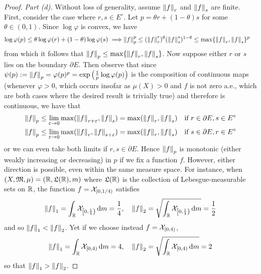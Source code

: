\begin{proof}
    \emph{Part (d).} Without loss of generality, assume \(\norm{f}_r\) and \(\norm{f}_s\) are finite. First, consider the case where \(r, s \in E^\circ\). Let \(p = \theta r + (1 - \theta) s\) for some \(\theta \in (0, 1)\). Since \(\log\varphi\) is convex, we have 
    \begin{align*}
        \log\varphi(p) \leq \theta \log\varphi(r) + (1 - \theta) \log\varphi(s) 
        \implies & \norm{f}_p^p \leq (\norm{f}_r^r)^\theta (\norm{f}_s^s)^{1 - \theta} 
        \leq \max\{\norm{f}_r, \norm{f}_s\}^p 
    \end{align*}
    from which it follows that \(\norm{f}_p \leq \max\{ \norm{f}_r, \norm{f}_s \}\). Now suppose either \(r\) or \(s\) lies on the boundary \(\partial E\). Then observe that since \(\psi(p) := \norm{f}_p = \varphi(p)^p = \exp \left( \frac{1}{p} \log \varphi(p) \right)\) is the composition of continuous maps (whenever \(\varphi > 0\), which occurs insofar as \(\mu(X) > 0\) and \(f\) is not zero a.e., which are both cases where the desired result is trivially true) and therefore is continuous, we have that
    \begin{align*}
        & \norm{f}_p \leq \lim_{\varepsilon \to 0} \max( \norm{f}_{r + \varepsilon}, \norm{f}_s ) = \max( \norm{f}_r, \norm{f}_s) 
        \quad \text{if } r \in \partial E, s \in E^\circ \\
        & \norm{f}_p \leq \lim_{\varepsilon \to 0} \max( \norm{f}_r, \norm{f}_{s + \varepsilon} ) = \max( \norm{f}_r, \norm{f}_s) 
        \quad \text{if } s \in \partial E, r \in E^\circ
    \end{align*}
    or we can even take both limits if \(r, s \in \partial E\). Hence \(\norm{f}_p\) is monotonic (either weakly increasing or decreasing) in \(p\) if we fix a function \(f\). However, either direction is possible, even within the same measure space. For instance, when \((X, \mathfrak{M}, \mu) = (\mathbb{R}, \mathfrak{L}(\mathbb{R}), m)\) where \(\mathfrak{L}(\mathbb{R})\) is the collection of Lebesgue-measurable sets on \(\mathbb{R}\), the function \(f=\mathcal{X}_{[0, 1/4)}\) satisfies
    \[
        \norm{f}_1 = \int_\mathbb{R} \mathcal{X}_{\left[0, \frac{1}{4}\right)} \, \mathrm{d}m = \frac{1}{4},
        \quad 
        \norm{f}_2 = \sqrt{\int_\mathbb{R} \mathcal{X}_{\left[0, \frac{1}{4}\right)} \, \mathrm{d}m} = \frac{1}{2}
    \]
    and so \(\norm{f}_1 < \norm{f}_2\). Yet if we choose instead \(f = \mathcal{X}_{[0, 4)}\), 
    \[
        \norm{f}_1 = \int_{\mathbb{R}} \mathcal{X}_{[0, 4)} \, \mathrm{d}m = 4,
        \quad
        \norm{f}_2 = \sqrt{\int_{\mathbb{R}} \mathcal{X}_{[0, 4)} \, \mathrm{d}m} = 2
    \]
    so that \(\norm{f}_1 > \norm{f}_2\). 
\end{proof}

